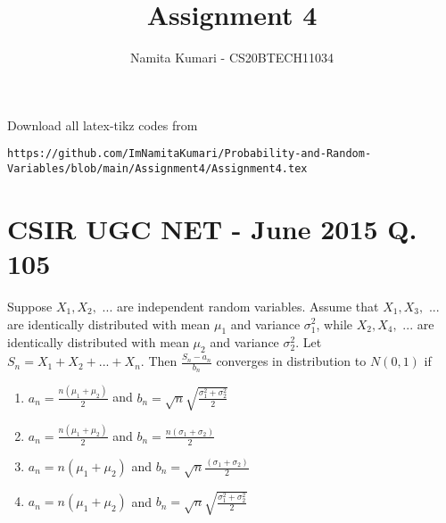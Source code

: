 \documentclass[journal,12pt,twocolumn]{IEEEtran}
\begin{document}
\makeatletter
{}
\makeatother
\let\StandardTheFigure\thefigure
\let\vec\mathbf
\renewcommand{\thefigure}{\theproblem}
\def\putbox#1#2#3{\makebox[0in][l]{\makebox[#1][l]{}\raisebox{\baselineskip}[0in][0in]{\raisebox{#2}[0in][0in]{#3}}}}
     \def\rightbox#1{\makebox[0in][r]{#1}}
     \def\centbox#1{\makebox[0in]{#1}}
     \def\topbox#1{\raisebox{-\baselineskip}[0in][0in]{#1}}
     \def\midbox#1{\raisebox{-0.5\baselineskip}[0in][0in]{#1}}
\vspace{3cm}
\title{Assignment 4}
\author{Namita Kumari - CS20BTECH11034}
\maketitle
\newpage
\bigskip
Download all latex-tikz codes from 
%
\begin{lstlisting}
https://github.com/ImNamitaKumari/Probability-and-Random-Variables/blob/main/Assignment4/Assignment4.tex
\end{lstlisting}
\section{CSIR UGC NET - June 2015 Q. 105}
Suppose $X_1, X_2,$ ... are independent random variables. Assume that $X_1,X_3,$ ... are identically distributed with mean $\mu_1$ and variance $\sigma_1^2$, while $X_2,X_4,$ ... are identically distributed with mean $\mu_2$ and variance $\sigma_2^2$. Let $S_n=X_1+X_2+...+X_n$. Then $\frac{S_n-a_n}{b_n}$ converges in distribution to $N(0,1)$ if
\begin{enumerate}
    \item $a_n=\frac{n(\mu_1+\mu_2)}{2}$ and $b_n=\sqrt{n}\sqrt{\frac{\sigma_1^2+\sigma_2^2}{2}}$
    \item $a_n=\frac{n(\mu_1+\mu_2)}{2}$ and $b_n=\frac{n(\sigma_1+\sigma_2)}{2}$
    \item $a_n=n(\mu_1+\mu_2)$ and $b_n=\sqrt{n}\frac{(\sigma_1+\sigma_2)}{2}$
    \item $a_n=n(\mu_1+\mu_2)$ and $b_n=\sqrt{n}\sqrt{\frac{\sigma_1^2+\sigma_2^2}{2}}$
\end{enumerate}
\end{document}
